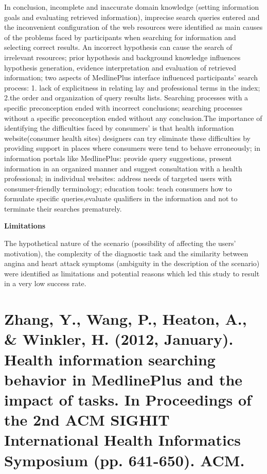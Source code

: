 \documentclass[]{article}
\begin{document}
In conclusion, incomplete and inaccurate domain knowledge (setting information goals and evaluating retrieved information), imprecise search queries entered and the inconvenient configuration of the web resources were identified as main causes of the problems faced by participants when searching for information and selecting correct results. An incorrect hypothesis can cause the search of irrelevant resources;  prior hypothesis and background knowledge influences hypothesis generation, evidence interpretation and evaluation of retrieved information; two aspects of MedlinePlus interface influenced participants’ search process: 1. lack of explicitness in relating lay and professional terms in the index; 2.the order and organization of query results lists. Searching processes with a specific preconception ended with incorrect conclusions; searching processes without a specific preconception ended without any conclusion.The importance of identifying the difficulties faced by consumers’ is that health information website(consumer health sites) designers can try eliminate these difficulties by providing support in places where consumers were tend to behave erroneously; in information portals like MedlinePlus: provide query suggestions, present information in an organized manner and suggest consultation with a health professional; in individual websites: address needs of targeted users with consumer-friendly terminology; education tools: teach consumers how to formulate specific queries,evaluate qualifiers in the information and not to terminate their searches prematurely.

\textbf{Limitations}

The hypothetical nature of the scenario (possibility of affecting the users’ motivation), the complexity of the diagnostic task and the similarity between angina and heart attack symptoms (ambiguity in the description of the scenario) were identified as limitations and potential reasons which led this study to result in a very low success rate. 

\section{Zhang, Y., Wang, P., Heaton, A., \& Winkler, H. (2012, January). Health information searching behavior in MedlinePlus and the impact of tasks. In Proceedings of the 2nd ACM SIGHIT International Health Informatics Symposium (pp. 641-650). ACM.} 
\end{document}
